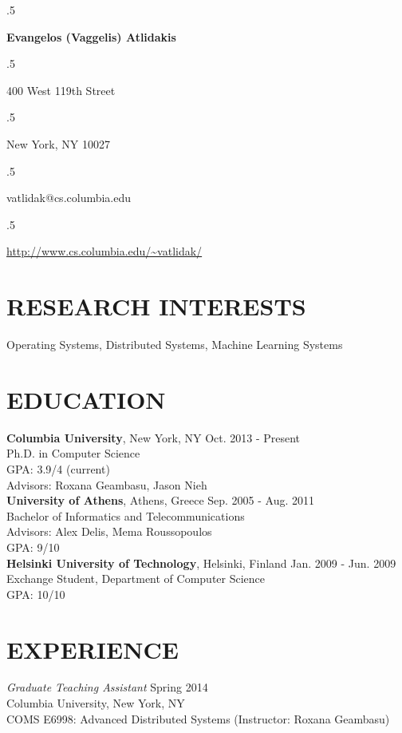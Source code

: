 \documentclass[overlapped,9pt]{res}
\begin{document}
\newcommand{\los}{{\sl $\ell$OS}}

 \moveleft.5\hoffset\centerline{\LARGE\bf Evangelos (Vaggelis) Atlidakis}
 \vspace{5pt}
 \moveleft.5\hoffset\centerline{400 West 119th Street}
 \moveleft.5\hoffset\centerline{New York, NY 10027}
 \moveleft.5\hoffset\centerline{vatlidak@cs.columbia.edu}
 \moveleft.5\hoffset\centerline{\url{http://www.cs.columbia.edu/~vatlidak/}}

\frenchspacing
\begin{resume}


\section{RESEARCH INTERESTS}
  Operating Systems, Distributed Systems, Machine Learning Systems

\section{EDUCATION}
  {\bf Columbia University}, New York, NY \hfill Oct. 2013 - Present\\
  Ph.D. in Computer Science \\
  GPA: 3.9/4 (current)\\
  Advisors: Roxana Geambasu, Jason Nieh \\
  {\bf University of Athens}, Athens, Greece \hfill Sep. 2005 - Aug. 2011 \\
  Bachelor of Informatics and Telecommunications \\
  Advisors: Alex Delis, Mema Roussopoulos\\
  GPA: 9/10\\
  {\bf Helsinki University of Technology}, Helsinki, Finland \hfill Jan. 2009 - Jun. 2009\\
  Exchange Student, Department of Computer Science \\
  GPA: 10/10

\section{EXPERIENCE}
  {\sl Graduate Teaching Assistant} \hfill Spring 2014 \\
  Columbia University, New York, NY \\
  COMS E6998: Advanced Distributed Systems (Instructor: Roxana Geambasu)



\end{resume}
\end{document}
